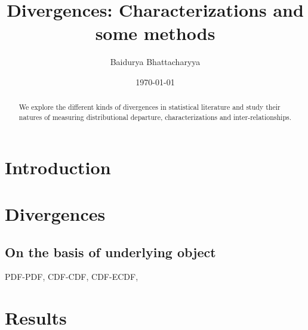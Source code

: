 \documentclass[11pt]{article}
\title{Divergences: Characterizations and some methods}
\author{Baidurya Bhattacharyya}
\date{\today}
\theoremstyle{plain}
\theoremstyle{remark}
\theoremstyle{definition}
\begin{document}
	
	\maketitle
	
	\begin{abstract}
		We explore the different kinds of divergences in statistical literature and study their natures of measuring distributional departure, characterizations and inter-relationships.
	\end{abstract}
	
	\tableofcontents
	
\section{Introduction}
\section{Divergences}
\subsection{On the basis of underlying object}
PDF-PDF, CDF-CDF, CDF-ECDF,
\section{Results}
\end{document}
